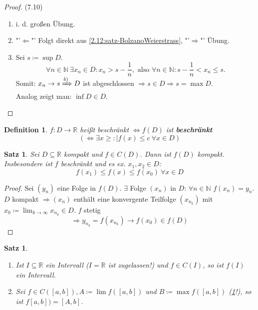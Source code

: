 \documentclass[titlepage,ngerman,a4paper,headsepline]{scrartcl}
\newcommand{\N}{\mathbb{N}}
\newcommand{\R}{\mathbb{R}}
\theoremstyle{named}
\theoremstyle{dotless}
\newtheorem{satz}[namedtheorem]{Satz}
\newtheorem*{definition}{Definition}
\begin{document}
\begin{proof}(7.10)
	\begin{enumerate}
		\item i. d. gro{\ss}en Übung.
		\item "'$\Leftarrow$"' Folgt direkt aus \ref{2.12:satz-BolzanoWeierstrass}, "'$\Rightarrow$"' Übung.
		\item Sei $s \coloneqq \sup D$. 
			$$ \forall n \in \N ~\exists x_{n} \in D: x_{n} > s - \frac{1}{n}, \text{ also } \forall n \in \N: s - \frac{1}{n} < x_{n} \leq s. $$
			 Somit: $x_{n} \rightarrow s \xRightarrow[]{b)} D$ ist abgeschlossen $\Rightarrow s \in D \Rightarrow s = \max D$. \\
			 Analog zeigt man: $\inf D \in D$.
	\end{enumerate}	
\end{proof}

\begin{definition}
	$f \colon D \rightarrow \R$ hei{\ss}t beschränkt $\iff f(D)$ ist \textbf{beschränkt} $$ (\iff \exists x \geq : |f(x) \leq c ~\forall x \in D) $$
\end{definition}


\begin{satz} \label{7.11:satz}
	Sei $D \subseteq \R$ kompakt und $f \in C(D)$. Dann ist $f(D)$ kompakt. Insbesondere ist $f$ beschränkt	und es ex. $x_{1}, x_{2} \in D$: 
		$$ f(x_{1}) \leq f(x) \leq f(x_{0}) ~\forall x \in D $$
\end{satz}

\begin{proof}
	Sei $(y_{n})$ eine Folge in $f(D)$. $\exists$ Folge $(x_{n})$ in $D$: $\forall n \in \N$ $f(x_{n}) = y_{n}$. $D$ kompakt $\Rightarrow (x_{n})$ enthält eine konvergente Teilfolge $(x_{n_{k}})$ mit $x_{0} \coloneqq \lim_{k \rightarrow \infty} x_{n_{k}} \in D$. $f$ stetig 
	$$ \Rightarrow y_{n_{k}} = f(x_{n_{k}}) \rightarrow f(x_{0}) \in f(D) $$
\end{proof}


\begin{satz} ~\ \label{7.12:satz}
	\begin{enumerate}
		\item Ist $I \subseteq \R$ ein Intervall ($I = \R$ ist zugelassen!) und $f \in C(I)$, so ist $f(I)$ ein Intervall.
		\item Sei $f \in C([a, b]), A \coloneqq \lim f([a, b])$ und $B \coloneqq \max f([a, b])$ (\ref{7.11:satz}!), so ist $f[a, b]) = [A, b]$.
	\end{enumerate}
\end{satz}
\end{document}
